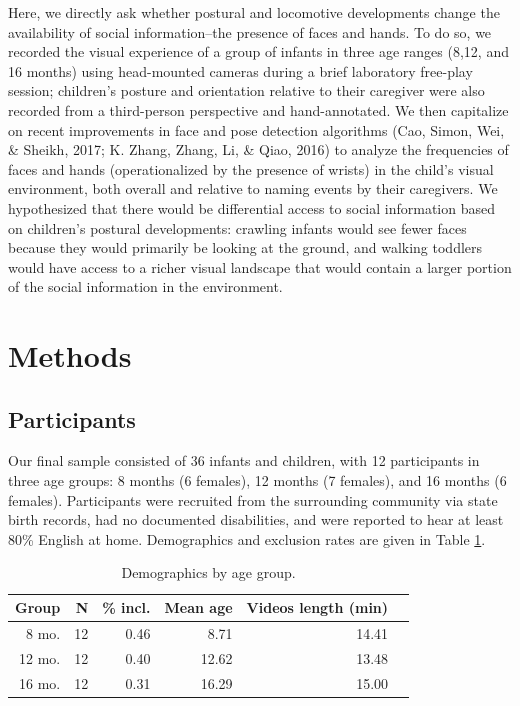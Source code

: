 \documentclass[10pt, letterpaper]{article}
\begin{document}
Here, we directly ask whether postural and locomotive developments
change the availability of social information--the presence of faces and
hands. To do so, we recorded the visual experience of a group of infants
in three age ranges (8,12, and 16 months) using head-mounted cameras
during a brief laboratory free-play session; children's posture and
orientation relative to their caregiver were also recorded from a
third-person perspective and hand-annotated. We then capitalize on
recent improvements in face and pose detection algorithms (Cao, Simon,
Wei, \& Sheikh, 2017; K. Zhang, Zhang, Li, \& Qiao, 2016) to analyze the
frequencies of faces and hands (operationalized by the presence of
wrists) in the child's visual environment, both overall and relative to
naming events by their caregivers. We hypothesized that there would be
differential access to social information based on children's postural
developments: crawling infants would see fewer faces because they would
primarily be looking at the ground, and walking toddlers would have
access to a richer visual landscape that would contain a larger portion
of the social information in the environment.

\section{Methods}\label{methods}

\subsection{Participants}\label{participants}

Our final sample consisted of 36 infants and children, with 12
participants in three age groups: 8 months (6 females), 12 months (7
females), and 16 months (6 females). Participants were recruited from
the surrounding community via state birth records, had no documented
disabilities, and were reported to hear at least 80\% English at home.
Demographics and exclusion rates are given in Table \ref{tab:pop}.

\begin{table}[H]
\centering
\begin{tabular}{rrrrrr}
  \hline
 Group & N & \% incl. & Mean age & Videos length (min) \\ 
  \hline
   8 mo. &   12 & 0.46 & 8.71 & 14.41 \\ 
   12 mo. &  12 & 0.40 & 12.62 & 13.48 \\ 
   16 mo. &  12 & 0.31 & 16.29 & 15.00\\ 
   \hline
\end{tabular}
\caption{\label{tab:pop} Demographics by age group.}
\end{table}
\end{document}
